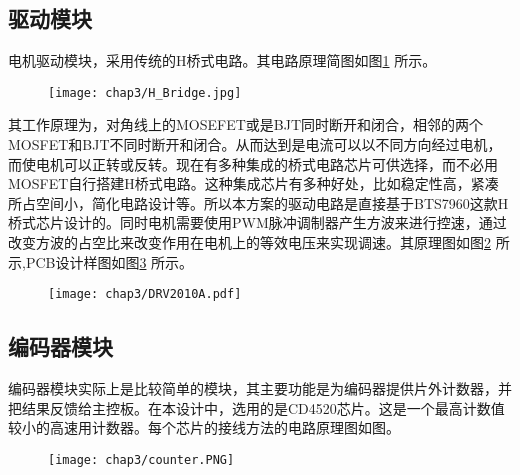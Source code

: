 \subsection{驱动模块}
电机驱动模块，采用传统的H桥式电路。其电路原理简图如图\ref{fig.DrvPrinciple} 所示。 
\begin{figure}[!htp]\label{fig.DrvPrinciple}
  \centering
	\texttt{[image: chap3/H\_Bridge.jpg]}
\end{figure}


其工作原理为，对角线上的MOSEFET或是BJT同时断开和闭合，相邻的两个MOSFET和BJT不同时断开和闭合。从而达到是电流可以以不同方向经过电机，而使电机可以正转或反转。现在有多种集成的桥式电路芯片可供选择，而不必用MOSFET自行搭建H桥式电路。这种集成芯片有多种好处，比如稳定性高，紧凑所占空间小，简化电路设计等。所以本方案的驱动电路是直接基于BTS7960这款H桥式芯片设计的。同时电机需要使用PWM脉冲调制器产生方波来进行控速，通过改变方波的占空比来改变作用在电机上的等效电压来实现调速。其原理图如图\ref{fig.Drv} 所示,PCB设计样图如图\ref{fig.DrvPCB} 所示。
\begin{figure}[!htp]\label{fig.Drv}
  \centering
  \texttt{[image: chap3/DRV2010A.pdf]}
\end{figure}
\begin{figure}\label{fig.DrvPCB}
  \centering
  \hspace{1in}
\end{figure}

\subsection{编码器模块}
编码器模块实际上是比较简单的模块，其主要功能是为编码器提供片外计数器，并把结果反馈给主控板。在本设计中，选用的是CD4520芯片。这是一个最高计数值较小的高速用计数器。每个芯片的接线方法的电路原理图如图。\\
\begin{figure}[!htp]\label{fig.ConSch}
  \centering
  \texttt{[image: chap3/counter.PNG]}
\end{figure}

